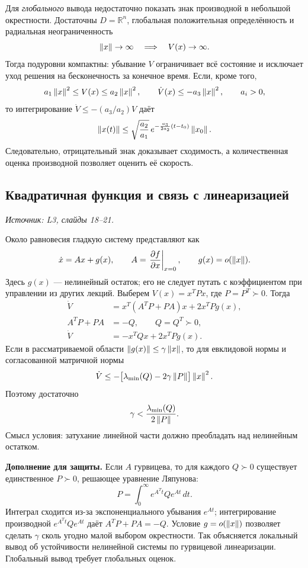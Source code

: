 Для \emph{глобального} вывода недостаточно показать знак производной
в небольшой окрестности. Достаточны $D=\mathbb R^n$,
глобальная положительная определённость и радиальная
неограниченность
\[
 \left\lVert x\right\rVert\to\infty\quad\Longrightarrow\quad V(x)\to\infty.
\]
Тогда подуровни компактны: убывание $V$ ограничивает всё состояние
и исключает уход решения на бесконечность за конечное время.
Если, кроме того,
\[
 a_1\left\lVert x\right\rVert^2\le V(x)\le a_2\left\lVert x\right\rVert^2,
 \qquad \dot V(x)\le-a_3\left\lVert x\right\rVert^2,\qquad a_i>0,
\]
то интегрирование $\dot V\le-(a_3/a_2)V$ даёт
\[
 \left\lVert x(t)\right\rVert\le\sqrt{\frac{a_2}{a_1}}\,
 e^{-\frac{a_3}{2a_2}(t-t_0)}\left\lVert x_0\right\rVert.
\]
Следовательно, отрицательный знак доказывает сходимость,
а количественная оценка производной позволяет оценить её скорость.

\subsection{Квадратичная функция и связь с линеаризацией}
\label{subsec:stability-linearization}
\noindent\textit{Источник: L3, слайды 18--21.}

Около равновесия гладкую систему представляют как
\[
 \dot x=Ax+g(x),\qquad
 A=\left.\frac{\partial f}{\partial x}\right|_{x=0},
 \qquad g(x)=o(\left\lVert x\right\rVert).
\]
Здесь $g(x)$ --- нелинейный остаток; его не следует путать с
коэффициентом при управлении из других лекций.
Выберем $V(x)=x^TPx$, где $P=P^T\succ0$. Тогда
\[
 \begin{aligned}
 \dot V
 &=x^T(A^TP+PA)x+2x^TPg(x),\\
 A^TP+PA&=-Q,\qquad Q=Q^T\succ0,\\
 \dot V&=-x^TQx+2x^TPg(x).
 \end{aligned}
\]
Если в рассматриваемой области $\left\lVert g(x)\right\rVert\le\gamma\left\lVert x\right\rVert$,
то для евклидовой нормы и согласованной матричной нормы
\[
 \dot V\le-\bigl[\lambda_{\min}(Q)-2\gamma\left\lVert P\right\rVert\bigr]\left\lVert x\right\rVert^2.
\]
Поэтому достаточно
\[
 \gamma<\frac{\lambda_{\min}(Q)}{2\left\lVert P\right\rVert}.
\]
Смысл условия: затухание линейной части должно преобладать
над нелинейным остатком.

\textbf{Дополнение для защиты.}
Если $A$ гурвицева, то для каждого $Q\succ0$ существует
единственное $P\succ0$, решающее уравнение Ляпунова:
\[
 P=\int_0^\infty e^{A^Tt}Qe^{At}\,dt.
\]
Интеграл сходится из-за экспоненциального убывания $e^{At}$;
интегрирование производной $e^{A^Tt}Qe^{At}$ даёт
$A^TP+PA=-Q$.
Условие $g=o(\left\lVert x\right\rVert)$ позволяет сделать $\gamma$ сколь угодно
малой выбором окрестности. Так объясняется локальный вывод
об устойчивости нелинейной системы по гурвицевой линеаризации.
Глобальный вывод требует глобальных оценок.


